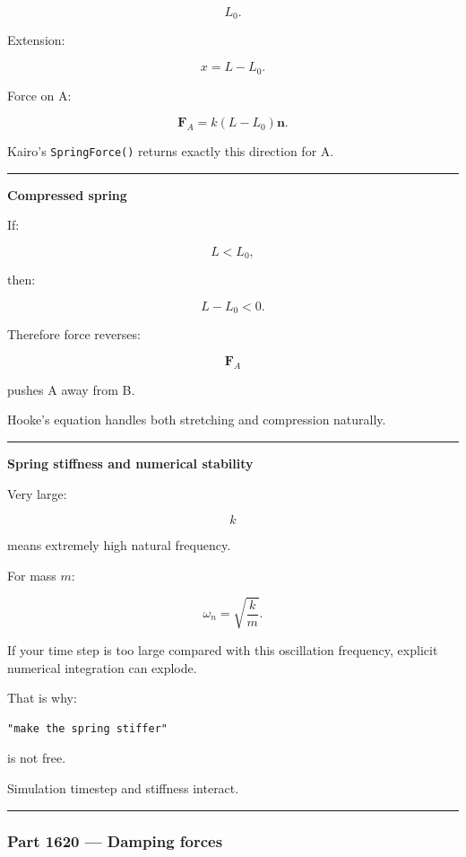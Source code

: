 \[
L_0.
\]

Extension:

\[
x=L-L_0.
\]

Force on A:

\[
\boxed{
\mathbf{F}_A
=
k(L-L_0)\mathbf{n}.
}
\]

Kairo's \texttt{SpringForce()} returns exactly this direction for A.

\begin{center}\rule{0.5\linewidth}{0.5pt}\end{center}

\textbf{Compressed spring}

If:

\[
L<L_0,
\]

then:

\[
L-L_0<0.
\]

Therefore force reverses:

\[
\mathbf{F}_A
\]

pushes A away from B.

Hooke's equation handles both stretching and compression naturally.

\begin{center}\rule{0.5\linewidth}{0.5pt}\end{center}

\textbf{Spring stiffness and numerical stability}

Very large:

\[
k
\]

means extremely high natural frequency.

For mass \(m\):

\[
\omega_n
=
\sqrt{\frac{k}{m}}.
\]

If your time step is too large compared with this oscillation frequency, explicit numerical integration can explode.

That is why:

\begin{verbatim}
"make the spring stiffer"
\end{verbatim}

is not free.

Simulation timestep and stiffness interact.

\begin{center}\rule{0.5\linewidth}{0.5pt}\end{center}

\subsubsection{Part 1620 --- Damping forces}\label{part-1620-damping-forces}

